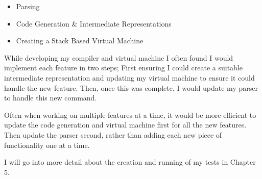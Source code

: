\begin{itemize}
	\item Parsing
	\item Code Generation \& Intermediate Representations 
	\item Creating a Stack Based Virtual Machine
\end{itemize}

While developing my compiler and virtual machine I often found I would implement each feature in two steps; First ensuring I could create a suitable intermediate representation and updating my virtual machine to ensure it could handle the new feature. Then, once this was complete, I would update my parser to handle this new command. 

Often when working on multiple features at a time, it would be more efficient to update the code generation and virtual machine first for all the new features. Then update the parser second, rather than adding each new piece of functionality one at a time. 

I will go into more detail about the creation and running of my tests in Chapter 5. 
   